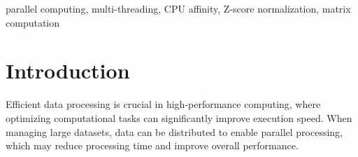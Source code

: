 \documentclass[journal]{./IEEE/IEEEtran}
\title{\SPTITLE}
\author{\ADVISEE
\REMARK
}
\begin{document}
\maketitle

\begin{abstract}
    This research examines the performance of a multi-threaded master-slave architecture for distributing parts of a matrix using sockets, both within a single PC and across multiple PCs. The study compares scenarios with and without CPU affinity. The focus is on the average runtime as the number of slaves increases. Results indicate that increasing the number of slaves reduces runtime significantly, with distributed computing across multiple machines showing the best performance. 
\end{abstract}

\begin{keywords}
parallel computing, multi-threading, CPU affinity, Z-score normalization, matrix computation
\end{keywords}

\section{Introduction}
Efficient data processing is crucial in high-performance computing, where optimizing computational tasks can significantly improve execution speed. When managing large datasets, data can be distributed to enable parallel processing, which may reduce processing time and improve overall performance.

\end{document}
